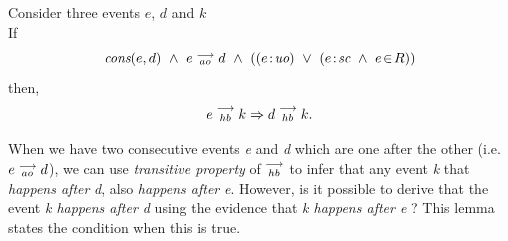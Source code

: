 
\begin{lemma}
    \label{Lemma2}
    Consider three events $e$, $d$ and $k$ \\

    If
        \[
            \cons{e}{d} \ \wedge \ \reln{e}{ao}{d} \ \wedge \
            (
                (\et{e}{uo}) \ \vee \
                (\et{e}{sc} \ \wedge \ \event{e}{R})
            )
        \]   
    then,
        \[
            e\stackrel{\longrightarrow}{_{hb}}k \Rightarrow d\stackrel{\longrightarrow}{_{hb}}k.
        \]

    When we have two consecutive events \textit{e} and \textit{d} which are one after the other (i.e. $e\stackrel{\longrightarrow}{_{ao}}d$), we can use \textit{transitive property} of $\stackrel{\longrightarrow}{_{hb}}$ to infer that any event \textit{k} that \textit{happens after} \textit{d}, also \textit{happens after} \textit{e}.
    However, is it possible to derive that the event \textit{k happens after d} using the evidence that \textit{k happens after e} ? This lemma states the condition when this is true.

\end{lemma}

